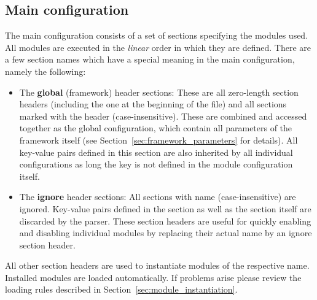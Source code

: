 \subsection{Main configuration}
\label{sec:main_config}
The main configuration consists of a set of sections specifying the modules used.
All modules are executed in the \emph{linear} order in which they are defined.
There are a few section names which have a special meaning in the main configuration, namely the following:
\begin{itemize}
\item The \textbf{global} (framework) header sections: These are all zero-length section headers (including the one at the beginning of the file) and all sections marked with the header \parameter{[Allpix]} (case-insensitive).
These are combined and accessed together as the global configuration, which contain all parameters of the framework itself (see Section~\ref{sec:framework_parameters} for details).
All key-value pairs defined in this section are also inherited by all individual configurations as long the key is not defined in the module configuration itself.
\item The \textbf{ignore} header sections: All sections with name \parameter{[Ignore]} (case-insensitive) are ignored.
Key-value pairs defined in the section as well as the section itself are discarded by the parser.
These section headers are useful for quickly enabling and disabling individual modules by replacing their actual name by an ignore section header.
\end{itemize}

All other section headers are used to instantiate modules of the respective name.
Installed modules are loaded automatically.
If problems arise please review the loading rules described in Section~\ref{sec:module_instantiation}.

